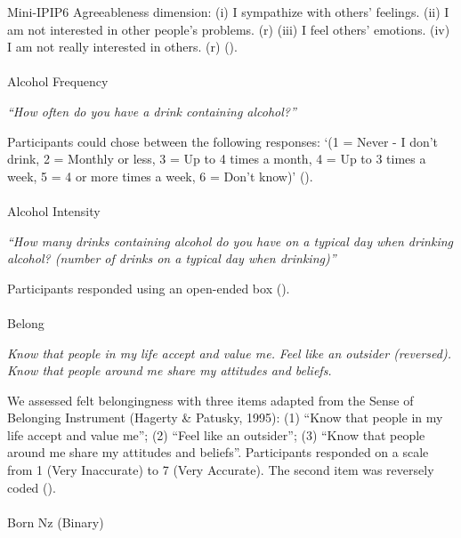 \documentclass[
  single column]{article}
\makeatletter
\let\oldparagraph\paragraph
\renewcommand{\paragraph}{
    \@ifstar
      \xxxParagraphStar
      \xxxParagraphNoStar
  }
\newcommand{\xxxParagraphStar}[1]{\oldparagraph*{#1}\mbox{}}
\newcommand{\xxxParagraphNoStar}[1]{\oldparagraph{#1}\mbox{}}
\makeatother
\begin{document}
Mini-IPIP6 Agreeableness dimension: (i) I sympathize with others'
feelings. (ii) I am not interested in other people's problems. (r) (iii)
I feel others' emotions. (iv) I am not really interested in others. (r)
().

\paragraph{Alcohol Frequency}\label{alcohol-frequency}

\emph{``How often do you have a drink containing alcohol?''}

Participants could chose between the following responses: `(1 = Never -
I don't drink, 2 = Monthly or less, 3 = Up to 4 times a month, 4 = Up to
3 times a week, 5 = 4 or more times a week, 6 = Don't know)'
().

\paragraph{Alcohol Intensity}\label{alcohol-intensity}

\emph{``How many drinks containing alcohol do you have on a typical day
when drinking alcohol? (number of drinks on a typical day when
drinking)''}

Participants responded using an open-ended box
().

\paragraph{Belong}\label{belong}

\emph{Know that people in my life accept and value me.} \emph{Feel like
an outsider (reversed).} \emph{Know that people around me share my
attitudes and beliefs.}

We assessed felt belongingness with three items adapted from the Sense
of Belonging Instrument (Hagerty \& Patusky, 1995): (1) ``Know that
people in my life accept and value me''; (2) ``Feel like an outsider'';
(3) ``Know that people around me share my attitudes and beliefs''.
Participants responded on a scale from 1 (Very Inaccurate) to 7 (Very
Accurate). The second item was reversely coded
().

\paragraph{Born Nz (Binary)}\label{born-nz-binary}
\end{document}
